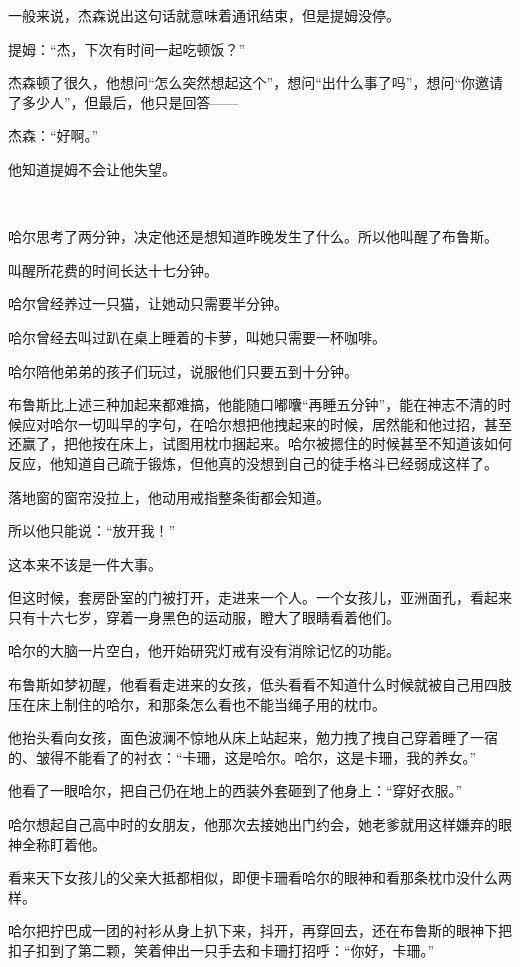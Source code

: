 \documentclass[../main.tex]{subfiles}
\begin{document}
一般来说，杰森说出这句话就意味着通讯结束，但是提姆没停。

提姆：“杰，下次有时间一起吃顿饭？”

杰森顿了很久，他想问“怎么突然想起这个”，想问“出什么事了吗”，想问“你邀请了多少人”，但最后，他只是回答——

杰森：“好啊。”

他知道提姆不会让他失望。

~\

哈尔思考了两分钟，决定他还是想知道昨晚发生了什么。所以他叫醒了布鲁斯。

叫醒所花费的时间长达十七分钟。

哈尔曾经养过一只猫，让她动只需要半分钟。

哈尔曾经去叫过趴在桌上睡着的卡萝，叫她只需要一杯咖啡。

哈尔陪他弟弟的孩子们玩过，说服他们只要五到十分钟。

布鲁斯比上述三种加起来都难搞，他能随口嘟囔“再睡五分钟”，能在神志不清的时候应对哈尔一切叫早的字句，在哈尔想把他拽起来的时候，居然能和他过招，甚至还赢了，把他按在床上，试图用枕巾捆起来。哈尔被摁住的时候甚至不知道该如何反应，他知道自己疏于锻炼，但他真的没想到自己的徒手格斗已经弱成这样了。

落地窗的窗帘没拉上，他动用戒指整条街都会知道。

所以他只能说：“放开我！”

这本来不该是一件大事。

但这时候，套房卧室的门被打开，走进来一个人。一个女孩儿，亚洲面孔，看起来只有十六七岁，穿着一身黑色的运动服，瞪大了眼睛看着他们。

哈尔的大脑一片空白，他开始研究灯戒有没有消除记忆的功能。

布鲁斯如梦初醒，他看看走进来的女孩，低头看看不知道什么时候就被自己用四肢压在床上制住的哈尔，和那条怎么看也不能当绳子用的枕巾。

他抬头看向女孩，面色波澜不惊地从床上站起来，勉力拽了拽自己穿着睡了一宿的、皱得不能看了的衬衣：“卡珊，这是哈尔。哈尔，这是卡珊，我的养女。”

他看了一眼哈尔，把自己仍在地上的西装外套砸到了他身上：“穿好衣服。”

哈尔想起自己高中时的女朋友，他那次去接她出门约会，她老爹就用这样嫌弃的眼神全称盯着他。

看来天下女孩儿的父亲大抵都相似，即便卡珊看哈尔的眼神和看那条枕巾没什么两样。

哈尔把拧巴成一团的衬衫从身上扒下来，抖开，再穿回去，还在布鲁斯的眼神下把扣子扣到了第二颗，笑着伸出一只手去和卡珊打招呼：“你好，卡珊。”
\end{document}
